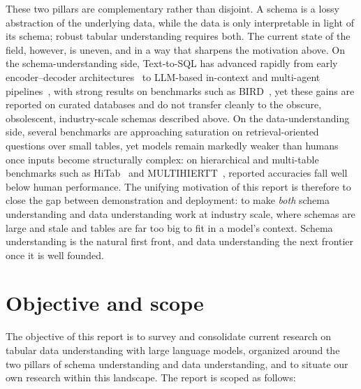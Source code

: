 These two pillars are complementary rather than disjoint. A schema is a lossy abstraction of the underlying data, while the data is only interpretable in light of its schema; robust tabular understanding requires both. The current state of the field, however, is uneven, and in a way that sharpens the motivation above. On the schema-understanding side, Text-to-SQL has advanced rapidly from early encoder--decoder architectures~\cite{zhong2017seq2sql} to LLM-based in-context and multi-agent pipelines~\cite{pourreza2023din,wang2024mac,pourreza2024chase}, with strong results on benchmarks such as BIRD~\cite{li2023bird}, yet these gains are reported on curated databases and do not transfer cleanly to the obscure, obsolescent, industry-scale schemas described above. On the data-understanding side, several benchmarks are approaching saturation on retrieval-oriented questions over small tables, yet models remain markedly weaker than humans once inputs become structurally complex: on hierarchical and multi-table benchmarks such as HiTab~\cite{cheng2022hitab} and MULTIHIERTT~\cite{zhao2022multihiertt}, reported accuracies fall well below human performance. The unifying motivation of this report is therefore to close the gap between demonstration and deployment: to make \emph{both} schema understanding and data understanding work at industry scale, where schemas are large and stale and tables are far too big to fit in a model's context. Schema understanding is the natural first front, and data understanding the next frontier once it is well founded.

\section{Objective and scope}
The objective of this report is to survey and consolidate current research on tabular data understanding with large language models, organized around the two pillars of schema understanding and data understanding, and to situate our own research within this landscape. The report is scoped as follows:

